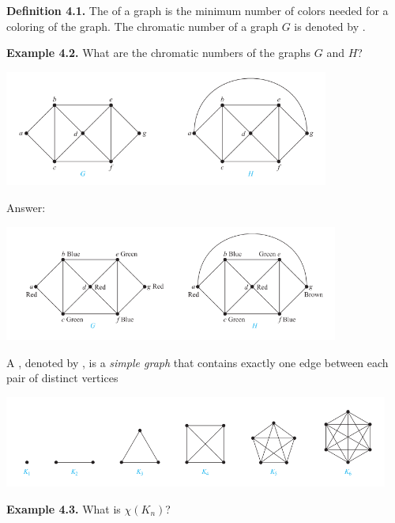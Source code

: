 \documentclass[aspectratio=169]{beamer}
\begin{document}
\begin{frame}[plain]{}

 {\bf Definition 4.1.} The  of a graph is 
 the minimum number of colors needed for a coloring of the graph. 
 The chromatic number of a graph $G$ is denoted by . \pause 
 \medskip
 
  {\bf Example 4.2.} What are the chromatic numbers of the graphs $G$ and $H$?
  \begin{center}
         \includegraphics[height=3.8cm]{./img/lecture4-fig1.png}
       \end{center}
 \vspace{.5in} 
 
\end{frame}

\begin{frame}[plain]{}

 Answer:
 
 \begin{center}
         \includegraphics[height=3.8cm]{./img/lecture4-fig2.png}
       \end{center}
 
\end{frame}


\begin{frame}[plain]{}


 A , denoted by , 
 is a \emph{simple graph} that contains exactly one edge between each pair of distinct vertices
 
 \begin{center}
         \includegraphics[height=3cm]{./img/lecture4-fig3.png}
       \end{center}


{\bf Example 4.3.} What is $\chi(K_n)$? %
\vspace{.5in}

\end{frame}
\end{document}
